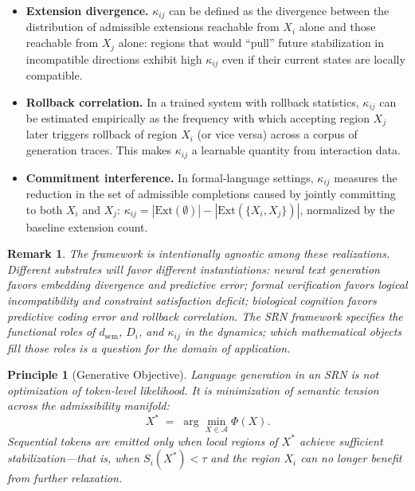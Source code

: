 \documentclass[11pt, a4paper]{article}
\theoremstyle{srn}
\newtheorem{principle}{Principle}[section]
\theoremstyle{srnremark}
\newtheorem{remark}{Remark}[section]
\newcommand{\Aspace}{\mathcal{A}}           %
\newcommand{\Phiten}{\varPhi}            %
\newcommand{\dsem}{d_{\mathrm{sem}}}  %
\begin{document}
\begin{itemize}
  \item \textbf{Extension divergence.}
    $\kappa_{ij}$ can be defined as the divergence between the
    distribution of admissible extensions reachable from $X_i$ alone
    and those reachable from $X_j$ alone: regions that would ``pull''
    future stabilization in incompatible directions exhibit high
    $\kappa_{ij}$ even if their current states are locally compatible.

  \item \textbf{Rollback correlation.}
    In a trained system with rollback statistics, $\kappa_{ij}$ can be
    estimated empirically as the frequency with which accepting region
    $X_j$ later triggers rollback of region $X_i$ (or vice versa)
    across a corpus of generation traces.
    This makes $\kappa_{ij}$ a learnable quantity from interaction data.

  \item \textbf{Commitment interference.}
    In formal-language settings, $\kappa_{ij}$ measures the reduction
    in the set of admissible completions caused by jointly committing
    to both $X_i$ and $X_j$:
    $\kappa_{ij} = |\mathrm{Ext}(\emptyset)| - |\mathrm{Ext}(\{X_i,
    X_j\})|$, normalized by the baseline extension count.
\end{itemize}

\begin{remark}
The framework is intentionally agnostic among these realizations.
Different substrates will favor different instantiations:
neural text generation favors embedding divergence and predictive
error; formal verification favors logical incompatibility and
constraint satisfaction deficit; biological cognition favors
predictive coding error and rollback correlation.
The SRN framework specifies the \emph{functional roles} of
$\dsem$, $D_i$, and $\kappa_{ij}$ in the dynamics; which
mathematical objects fill those roles is a question for the domain
of application.
\end{remark}

\begin{principle}[Generative Objective]
\label{prin:objective}
Language generation in an SRN is not optimization of token-level
likelihood. It is minimization of semantic tension across the
admissibility manifold:
\[
  X^* \;=\; \arg\min_{X \in \Aspace} \Phiten(X).
\]
Sequential tokens are emitted only when local regions of $X^*$ achieve
sufficient stabilization---that is, when $S_i(X^*) < \tau$ and the
region $X_i$ can no longer benefit from further relaxation.
\end{principle}
\end{document}
